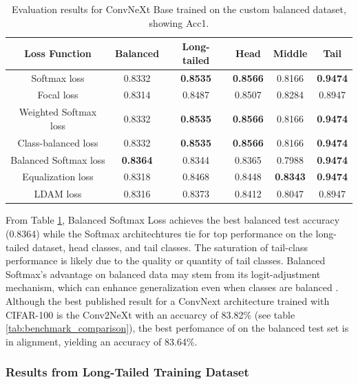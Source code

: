 \begin{table}[h!]
    \centering
    \caption{Evaluation results for ConvNeXt Base trained on the custom balanced dataset, showing Acc1.}
    \begin{tabular}{cccccc}
        \toprule
        Loss Function & Balanced & Long-tailed & Head & Middle & Tail \\ 
        \midrule
        Softmax loss   & 0.8332 & \textbf{0.8535} & \textbf{0.8566} & 0.8166 & \textbf{0.9474} \\
        Focal loss   & 0.8314 & 0.8487 & 0.8507 & 0.8284 & 0.8947 \\
        Weighted Softmax loss   & 0.8332 & \textbf{0.8535} & \textbf{0.8566} &  0.8166 & \textbf{0.9474} \\
        Class-balanced loss   & 0.8332 & \textbf{0.8535} & \textbf{0.8566} & 0.8166 & \textbf{0.9474} \\
        Balanced Softmax loss   & \textbf{0.8364} & 0.8344 & 0.8365 & 0.7988 & \textbf{0.9474} \\
        Equalization loss   & 0.8318 & 0.8468 & 0.8448 & \textbf{0.8343} & \textbf{0.9474} \\
        LDAM loss   & 0.8316 & 0.8373 & 0.8412 & 0.8047 & 0.8947 \\
        \bottomrule
    \end{tabular}
    \label{tab:conv_bal_acc1_1}
\end{table}

From Table \ref{tab:conv_bal_acc1_1}, Balanced Softmax Loss achieves the best balanced test accuracy (0.8364) while the Softmax architechtures tie for top performance on the long-tailed dataset, head classes, and tail classes. The saturation of tail-class performance is likely due to the quality or quantity of tail classes. Balanced Softmax’s advantage on balanced data may stem from its logit-adjustment mechanism, which can enhance generalization even when classes are balanced \cite{ren2020balancedmetasoftmaxlongtailedvisual} . Although the best published result for a ConvNext architecture trained with CIFAR-100 is the Conv2NeXt with an accuarcy of 83.82\% (see table \ref{tab:benchmark_comparison}), the best perfomance of on the balanced test set is in alignment, yielding an accuracy of 83.64\%.


\subsubsection{Results from Long-Tailed Training Dataset}


